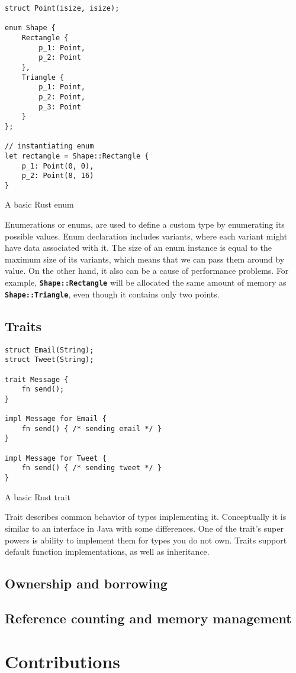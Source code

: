 \begin{listing}[ht!]
\begin{verbatim}
struct Point(isize, isize);

enum Shape {    
    Rectangle { 
        p_1: Point, 
        p_2: Point 
    }, 
    Triangle { 
        p_1: Point, 
        p_2: Point, 
        p_3: Point 
    }    
};

// instantiating enum
let rectangle = Shape::Rectangle {
    p_1: Point(0, 0), 
    p_2: Point(8, 16)
}
\end{verbatim}
\caption{A basic Rust enum}
\label{lst:enum}
\end{listing}

Enumerations or enums, are used to define a custom type by enumerating its possible values. Enum declaration includes variants, where each variant might have data associated with it. The size of an enum instance is equal to the maximum size of its variants, which means that we can pass them around by value. On the other hand, it also can be a cause of performance problems. For example, \texttt{\textbf{Shape::Rectangle}} will be allocated the same amount of memory as \texttt{\textbf{Shape::Triangle}}, even though it contains only two points. 

\subsection{Traits}

\begin{listing}[ht!]
\begin{verbatim}
struct Email(String);
struct Tweet(String);

trait Message {
    fn send();
}

impl Message for Email {
    fn send() { /* sending email */ }
}

impl Message for Tweet {
    fn send() { /* sending tweet */ }
}
\end{verbatim}
\caption{A basic Rust trait}
\label{lst:enum}
\end{listing}

Trait describes common behavior of types implementing it. Conceptually it is similar to an interface in Java with some differences. One of the trait's super powers is ability to implement them for types you do not own. Traits support default function implementations, as well as inheritance. 

\subsection{Ownership and borrowing}

\subsection{Reference counting and memory management}

\section{Contributions}
